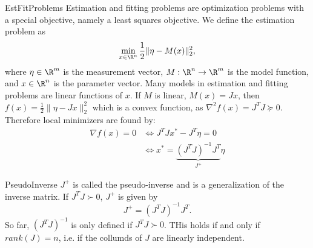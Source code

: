 \begin{theo}{EstFitProblems}
    Estimation and fitting problems are optimization problems with a special objective, namely a least squares objective. We define the estimation problem as
    \begin{equation*}
        \min_{x \in \R^n} \frac{1}{2} \| \eta - M(x) \|^2_2,
    \end{equation*}
    where $\eta \in \R^m$ is the measurement vector, $M: \R^n \to \R^m$ is the model function, and $x \in \R^n$ is the parameter vector.  Many models in estimation and fitting problems are linear functions of $x$. If $M$ is linear, $M(x) = Jx$, then $f(x) = \frac{1}{2} \| \eta - Jx \|^2_2$ which is a convex function, as $\nabla^2 f(x) = J^T J \succeq 0$. Therefore local minimizers are found by:
    \begin{align*}
        \nabla f(x) = 0 
            &\Leftrightarrow J^T J x^* - J^T \eta = 0 \\
            &\Leftrightarrow x^* = \underbrace{{(J^T J)}^{-1} J^T}_{J^+} \eta
    \end{align*}
    \vspace*{-0.5cm}
\end{theo}

\begin{theo}{PseudoInverse}
    $J^+$ is called the pseudo-inverse and is a generalization of the inverse matrix. If $J^T J \succ 0$, $J^+$ is given by 
    \begin{equation*}
        J^+ = {(J^T J)}^{-1} J^T.
    \end{equation*}
    So far, ${(J^T J)}^{-1}$ is only defined if $J^T J \succ 0$. THis holds if and only if $rank(J) = n$, i\@.e\@. if the collumds of $J$ are linearly independent. 
\end{theo}